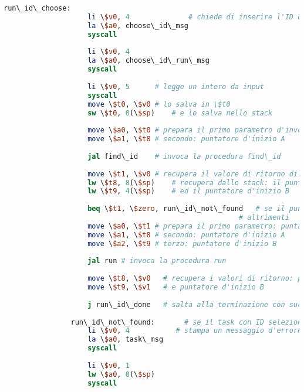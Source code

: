 \begin{center}
\begin{lstlisting}[language=mips, gobble=14, stepnumber=1]
                run\_id\_choose:
                    li \$v0, 4				# chiede di inserire l'ID del task da eseguire
                    la \$a0, choose\_id\_msg
                    syscall
                    
                    li \$v0, 4
                    la \$a0, choose\_id\_run\_msg
                    syscall
                    
                    li \$v0, 5		# legge un intero da input
                    syscall
                    move \$t0, \$v0	# lo salva in \$t0
                    sw \$t0, 0(\$sp)	# e lo salva nello stack
                    
                    move \$a0, \$t0	# prepara il primo parametro d'invocazione: ID inserito
                    move \$a1, \$t8	# secondo: puntatore d'inizio A
                    
                    jal find\_id	# invoca la procedura find\_id
                    
                    move \$t1, \$v0	# recupera il valore di ritorno di find\_id
                    lw \$t8, 8(\$sp)	# recupera dallo stack: il puntatore d'inizio A
                    lw \$t9, 4(\$sp)	# ed il puntatore d'inizio B
                    
                    beq \$t1, \$zero, run\_id\_not\_found	# se il puntatore restituito da find\_id è nullo, allora non c'è nessun task con l'ID inserito
                										# altrimenti
                    move \$a0, \$t1	# prepara il primo parametro: puntatore al task con ID selezionato
                    move \$a1, \$t8	# secondo: puntatore d'inizio A
                    move \$a2, \$t9	# terzo: puntatore d'inizio B
                    
                    jal run	# invoca la procedura run
                    
                    move \$t8, \$v0   # recupera i valori di ritorno: puntatore d'inizio A
                    move \$t9, \$v1   # e puntatore d'inizio B
                    
                    j run\_id\_done   # salta alla terminazione con successo della procedura
                
                run\_id\_not\_found:       # se il task con ID selezionato non è stato trovato
                    li \$v0, 4           # stampa un messaggio d'errore
                    la \$a0, task\_msg
                    syscall
                    
                    li \$v0, 1
                    lw \$a0, 0(\$sp)
                    syscall
                    

\end{lstlisting}
\end{center}
